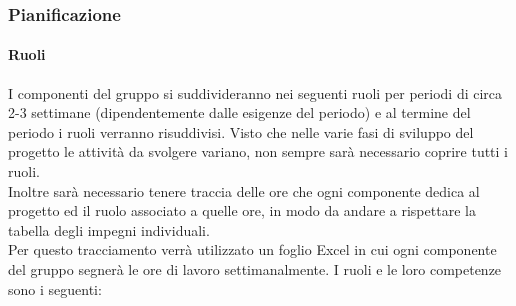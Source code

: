 \subsubsection{Pianificazione}

\paragraph{Ruoli}
I componenti del gruppo si suddivideranno nei seguenti ruoli per periodi di circa 2-3 settimane (dipendentemente dalle esigenze del periodo) e al termine del periodo i ruoli verranno risuddivisi. 
Visto che nelle varie fasi di sviluppo del progetto le attività da svolgere variano, non sempre sarà necessario coprire tutti i ruoli.\\
Inoltre sarà necessario tenere traccia delle ore che ogni componente dedica al progetto ed il ruolo associato a quelle ore, in modo da andare a rispettare la tabella degli impegni individuali.\\
Per questo tracciamento verrà utilizzato un foglio Excel in cui ogni componente del gruppo segnerà le ore di lavoro settimanalmente.
I ruoli e le loro competenze sono i seguenti:

